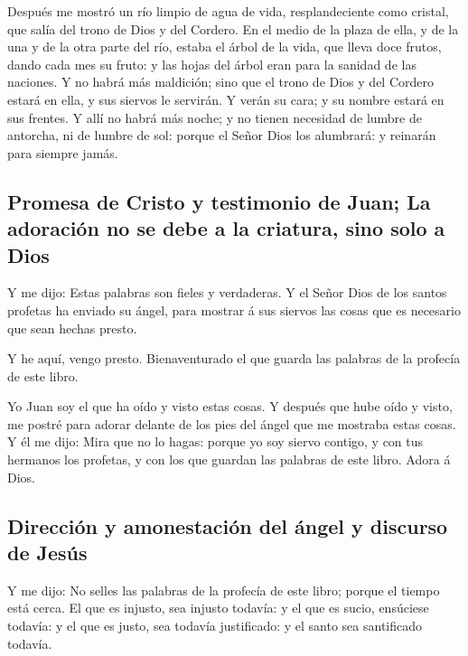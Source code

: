  Después me mostró un río limpio de agua de vida,
resplandeciente como cristal, que salía del trono de Dios y del Cordero.
 En el medio de la plaza de ella, y de la una y de la otra
parte del río, estaba el árbol de la vida, que lleva doce frutos, dando
cada mes su fruto: y las hojas del árbol eran para la sanidad de las
naciones.  Y no habrá más maldición; sino que el trono de
Dios y del Cordero estará en ella, y sus siervos le servirán.
 Y verán su cara; y su nombre estará en sus frentes.
 Y allí no habrá más noche; y no tienen necesidad de lumbre
de antorcha, ni de lumbre de sol: porque el Señor Dios los alumbrará: y
reinarán para siempre jamás.

\hypertarget{promesa-de-cristo-y-testimonio-de-juan-la-adoraciuxf3n-no-se-debe-a-la-criatura-sino-solo-a-dios}{%
\subsection{Promesa de Cristo y testimonio de Juan; La adoración no se
debe a la criatura, sino solo a
Dios}\label{promesa-de-cristo-y-testimonio-de-juan-la-adoraciuxf3n-no-se-debe-a-la-criatura-sino-solo-a-dios}}

 Y me dijo: Estas palabras son fieles y verdaderas. Y el
Señor Dios de los santos profetas ha enviado su ángel, para mostrar á
sus siervos las cosas que es necesario que sean hechas presto.

 Y he aquí, vengo presto. Bienaventurado el que guarda las
palabras de la profecía de este libro.

 Yo Juan soy el que ha oído y visto estas cosas. Y después
que hube oído y visto, me postré para adorar delante de los pies del
ángel que me mostraba estas cosas.  Y él me dijo: Mira que
no lo hagas: porque yo soy siervo contigo, y con tus hermanos los
profetas, y con los que guardan las palabras de este libro. Adora á
Dios.

\hypertarget{direcciuxf3n-y-amonestaciuxf3n-del-uxe1ngel-y-discurso-de-jesuxfas}{%
\subsection{Dirección y amonestación del ángel y discurso de
Jesús}\label{direcciuxf3n-y-amonestaciuxf3n-del-uxe1ngel-y-discurso-de-jesuxfas}}

 Y me dijo: No selles las palabras de la profecía de este
libro; porque el tiempo está cerca.  El que es injusto, sea
injusto todavía: y el que es sucio, ensúciese todavía: y el que es
justo, sea todavía justificado: y el santo sea santificado todavía.

